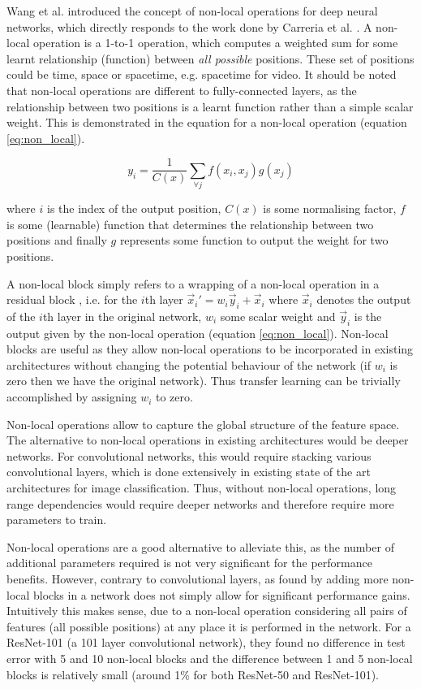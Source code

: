 \documentclass{report}
\theoremstyle{plain}
\theoremstyle{definition}
\theoremstyle{remark}
\numberwithin{equation}{section}
\numberwithin{figure}{section}
\newcommand{\<}{\langle}
\renewcommand{\>}{\rangle}
\begin{document}
Wang et al. \cite{wang_non-local_2017} introduced the concept of non-local operations for deep neural networks, which directly responds to the work done by Carreria et al. \cite{carreira_quo_2017}. A non-local operation is a 1-to-1 operation, which computes a weighted sum for some learnt relationship (function) between \textit{all possible} positions. These set of positions could be time, space or spacetime, e.g. spacetime for video. It should be noted that non-local operations are different to
fully-connected layers, as the relationship between two positions is a learnt function rather than a simple scalar weight. This is demonstrated in the equation for a non-local operation (equation \eqref{eq:non_local}).

\begin{equation}
\label{eq:non_local}
    y_i = \frac{1}{C(x)} \sum_{\forall j} f(x_i, x_j) g(x_j)
\end{equation}

where $i$ is the index of the output position, $C(x)$ is some normalising factor, $f$ is some (learnable) function that determines the relationship between two positions and finally $g$ represents some function to output the weight for two positions.

A non-local block simply refers to a wrapping of a non-local operation in a residual block \cite{he_deep_2015}, i.e. for the $i$th layer $\vec{x}_i' = w_i \vec{y}_i + \vec{x}_i$ where $\vec{x}_i$ denotes the output of the $i$th layer in the original network, $w_i$ some scalar weight and $\vec{y}_i$ is the output given by the non-local operation (equation \eqref{eq:non_local}). Non-local blocks are useful as they allow non-local operations to be incorporated in existing architectures without changing the potential behaviour of the network (if $w_i$ is zero then we have the original network). Thus transfer learning can be trivially accomplished by assigning $w_i$ to zero.

Non-local operations allow to capture the global structure of the feature space. The alternative to non-local operations in existing architectures would be deeper networks. For convolutional networks, this would require stacking various convolutional layers, which is done extensively in existing state of the art architectures for image classification. Thus, without non-local operations, long range dependencies would require deeper networks and therefore require more parameters to train.

Non-local operations are a good alternative to alleviate this, as the number of additional parameters required is not very significant for the performance benefits. However, contrary to convolutional layers, as found by \cite{wang_non-local_2017} adding more non-local blocks in a network does not simply allow for significant performance gains. Intuitively this makes sense, due to a non-local operation considering all pairs of features (all possible positions) at any place it is performed in the network. For a ResNet-101 \cite{he_deep_2015} (a 101 layer convolutional network), they found no difference in test error with 5 and 10 non-local blocks and the difference between 1 and 5 non-local blocks is relatively small (around 1\% for both ResNet-50 and ResNet-101).
\end{document}
